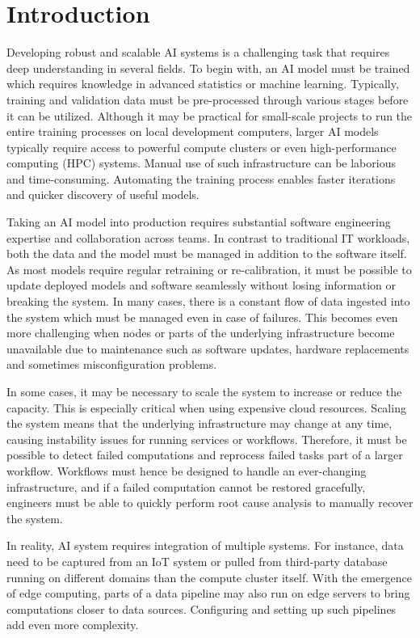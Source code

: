 \documentclass{article}
\begin{document}
\section{Introduction}
Developing robust and scalable AI systems is a challenging task that requires deep understanding in several fields. To begin with, an AI model must be trained which requires knowledge in advanced statistics or machine learning. Typically, training and validation data must be pre-processed through various stages before it can be utilized. Although it may be practical for small-scale projects to run the entire training processes on local development computers, larger AI models typically require access to powerful compute clusters or even high-performance computing (HPC) systems. Manual use of such infrastructure can be laborious and time-consuming. Automating the training process enables faster iterations and quicker discovery of useful models.

Taking an AI model into production requires substantial software engineering expertise and collaboration across teams. In contrast to traditional IT workloads, both the data and the model must be managed in addition to the software itself. As most models require regular retraining or re-calibration, it must be possible to update deployed models and software seamlessly without losing information or breaking the system. In many cases, there is a constant flow of data ingested into the system which must be managed even in case of failures. This becomes even more challenging when nodes or parts of the underlying infrastructure become unavailable due to maintenance such as software updates, hardware replacements and sometimes misconfiguration problems.

In some cases, it may be necessary to scale the system to increase or reduce the capacity. This is especially critical when using expensive cloud resources. Scaling the system means that the underlying infrastructure may change at any time, causing instability issues for running services or workflows. Therefore, it must be possible to detect failed computations and reprocess failed tasks part of a larger workflow. Workflows must hence be designed to handle an ever-changing infrastructure, and if a failed computation cannot be restored gracefully, engineers must be able to quickly perform root cause analysis to manually recover the system.

In reality, AI system requires integration of multiple systems. For instance, data need to be captured from an IoT system or pulled from third-party database running on different domains than the compute cluster itself. With the emergence of edge computing, parts of a data pipeline may also run on edge servers to bring computations closer to data sources. Configuring and setting up such pipelines add even more complexity. 
\end{document}
